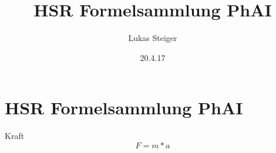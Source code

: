 \documentclass{article}
\author{Lukas Steiger}
\title{HSR Formelsammlung PhAI}
\date{20.4.17}
\begin{document}
	\part{HSR Formelsammlung PhAI}
	Kraft
	\begin{equation}
		F = m * a
	\end{equation}
\end{document}

